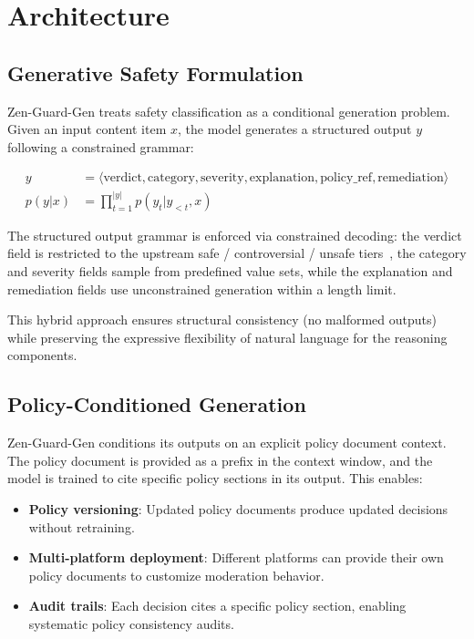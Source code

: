 \documentclass[11pt,a4paper]{article}
\begin{document}
\section{Architecture}

\subsection{Generative Safety Formulation}

Zen-Guard-Gen treats safety classification as a conditional generation problem. Given an input content item $x$, the model generates a structured output $y$ following a constrained grammar:

\begin{align}
  y &= \langle \text{verdict}, \text{category}, \text{severity}, \text{explanation}, \text{policy\_ref}, \text{remediation} \rangle \\
  p(y | x) &= \prod_{t=1}^{|y|} p(y_t | y_{<t}, x)
\end{align}

The structured output grammar is enforced via constrained decoding: the verdict field is
restricted to the upstream safe / controversial / unsafe tiers~\cite{qwen3guard}, the category
and severity fields sample from predefined value sets, while the explanation and remediation
fields use unconstrained generation within a length limit.

This hybrid approach ensures structural consistency (no malformed outputs) while preserving the expressive flexibility of natural language for the reasoning components.

\subsection{Policy-Conditioned Generation}

Zen-Guard-Gen conditions its outputs on an explicit policy document context. The policy document is provided as a prefix in the context window, and the model is trained to cite specific policy sections in its output. This enables:

\begin{itemize}
  \item \textbf{Policy versioning}: Updated policy documents produce updated decisions without retraining.
  \item \textbf{Multi-platform deployment}: Different platforms can provide their own policy documents to customize moderation behavior.
  \item \textbf{Audit trails}: Each decision cites a specific policy section, enabling systematic policy consistency audits.
\end{itemize}
\end{document}
